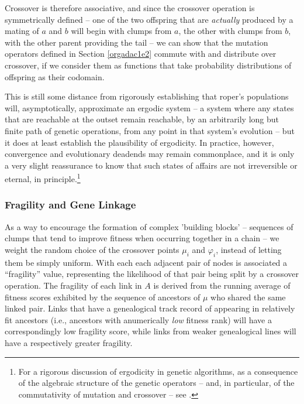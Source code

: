 \documentclass[12pt,glossary]{dalthesis}
\begin{document}
Crossover is therefore associative, and since the crossover operation is symmetrically
defined -- one of the two offspring that are \emph{actually} produced by a mating of \(a\) 
and \(b\) will begin with clumps from \(a\), the other with clumps from \(b\), with the other
parent providing the tail -- we can show that the mutation operators defined in
Section \ref{orgadac1e2} commute with and distribute over crossover, if we consider
them as functions that take probability distributions of offspring as their codomain. 

This is still some distance from rigorously establishing that \gls{roper}'s populations
will, asymptotically, approximate an ergodic system -- a system where any states that
are reachable at the outset remain reachable, by an arbitrarily long but
finite path of genetic operations, from any point in that system's evolution -- but
it does at least establish the plausibility of ergodicity. In practice, however,
convergence and evolutionary deadends may remain commonplace, and it is only a very
slight reassurance to know that such states of affairs are not irreversible or 
eternal, in principle.\footnote{For a rigorous discussion of ergodicity in genetic algorithms, as a consequence of the algebraic structure of the genetic operators -- and, in particular, of the commutativity of mutation and crossover -- see \cite{schmitt01}.}


\subsubsection{Fragility and Gene Linkage}
\label{sec:orgbebee99}
\label{org44a98c5}

As a way to encourage the formation of complex 'building blocks' -- sequences of
clumps that tend to improve fitness when occurring together in a chain -- we
weight the random choice of the crossover points \(\mu_i\) and \(\varphi_i\),
instead of letting them be simply uniform. With each each adjacent pair of nodes
is associated a ``fragility'' value, representing the likelihood of that
pair being split by a crossover operation. The fragility of each link in \(A\) is
derived from the running average of fitness scores exhibited by the sequence of
ancestors of \(\mu\) who shared the same linked pair. Links that have a genealogical
track record of appearing in relatively fit ancestors (i.e., ancestors with anumerically 
\emph{low} fitness rank) will have a correspondingly low fragility score, while links
from weaker genealogical lines will have a respectively greater fragility.
\end{document}
